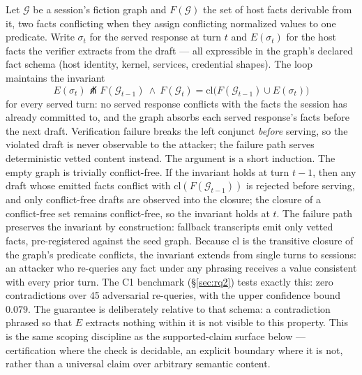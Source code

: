 \begin{property}
\label{prop:consistency}
Let $\mathcal{G}$ be a session's fiction graph and $F(\mathcal{G})$ the set
of host facts derivable from it, two facts conflicting when they assign
conflicting normalized values to one predicate. Write $\sigma_t$ for the
served response at turn $t$ and $E(\sigma_t)$ for the host facts the
verifier extracts from the draft --- all expressible in the graph's
declared fact schema (host identity, kernel, services, credential
shapes). The loop maintains the invariant
\begin{equation*}
E(\sigma_t) \not\pitchfork F(\mathcal{G}_{t-1}) \ \wedge \ F(\mathcal{G}_t) = \mathrm{cl}\big(F(\mathcal{G}_{t-1}) \cup E(\sigma_t)\big)
\end{equation*}
for every served turn: no served response conflicts with the facts the
session has already committed to, and the graph absorbs each served
response's facts before the next draft. Verification failure breaks the
left conjunct \emph{before} serving, so the violated draft is never
observable to the attacker; the failure path serves deterministic vetted
content instead. The argument is a short induction. The empty graph is
trivially conflict-free. If the invariant holds at turn $t-1$, then any
draft whose emitted facts conflict with $\mathrm{cl}(F(\mathcal{G}_{t-1}))$ is rejected
before serving, and only conflict-free drafts are observed into the
closure; the closure of a conflict-free set remains conflict-free, so the
invariant holds at $t$. The failure path preserves the invariant by
construction: fallback transcripts emit only vetted facts, pre-registered
against the seed graph. Because $\mathrm{cl}$ is the transitive closure of the
graph's predicate conflicts, the invariant extends from
single turns to sessions: an attacker who re-queries any fact under any
phrasing receives a value consistent with every prior turn. The C1
benchmark (\S\ref{sec:rq2}) tests exactly this: zero contradictions over
45 adversarial re-queries, with the upper confidence bound $0.079$.
The guarantee is deliberately relative to that schema: a contradiction
phrased so that $E$ extracts nothing within it is not visible to this
property. This is the same scoping discipline as the supported-claim
surface below --- certification where the check is decidable, an
explicit boundary where it is not, rather than a universal claim over
arbitrary semantic content.
\end{property}

